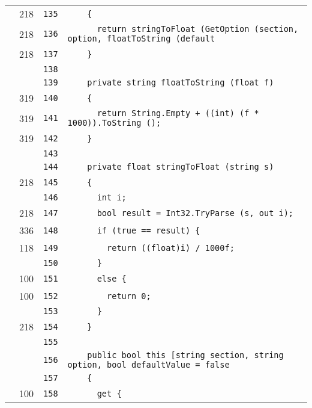 \documentclass[a4paper,10pt]{article}
\begin{document}
\begin{longtable}[l]{lrrl}
\cellcolor{green} & 218 & \verb~135~ & \verb~    {~\\
\cellcolor{green} & 218 & \verb~136~ & \verb~      return stringToFloat (GetOption (section, option, floatToString (default~\\
\cellcolor{green} & 218 & \verb~137~ & \verb~    }~\\
\cellcolor{gray} &  & \verb~138~ & \verb~~\\
\cellcolor{gray} &  & \verb~139~ & \verb~    private string floatToString (float f)~\\
\cellcolor{green} & 319 & \verb~140~ & \verb~    {~\\
\cellcolor{green} & 319 & \verb~141~ & \verb~      return String.Empty + ((int) (f * 1000)).ToString ();~\\
\cellcolor{green} & 319 & \verb~142~ & \verb~    }~\\
\cellcolor{gray} &  & \verb~143~ & \verb~~\\
\cellcolor{gray} &  & \verb~144~ & \verb~    private float stringToFloat (string s)~\\
\cellcolor{green} & 218 & \verb~145~ & \verb~    {~\\
\cellcolor{gray} &  & \verb~146~ & \verb~      int i;~\\
\cellcolor{green} & 218 & \verb~147~ & \verb~      bool result = Int32.TryParse (s, out i);~\\
\cellcolor{green} & 336 & \verb~148~ & \verb~      if (true == result) {~\\
\cellcolor{green} & 118 & \verb~149~ & \verb~        return ((float)i) / 1000f;~\\
\cellcolor{gray} &  & \verb~150~ & \verb~      }~\\
\cellcolor{green} & 100 & \verb~151~ & \verb~      else {~\\
\cellcolor{green} & 100 & \verb~152~ & \verb~        return 0;~\\
\cellcolor{gray} &  & \verb~153~ & \verb~      }~\\
\cellcolor{green} & 218 & \verb~154~ & \verb~    }~\\
\cellcolor{gray} &  & \verb~155~ & \verb~~\\
\cellcolor{gray} &  & \verb~156~ & \verb~    public bool this [string section, string option, bool defaultValue = false~\\
\cellcolor{gray} &  & \verb~157~ & \verb~    {~\\
\cellcolor{green} & 100 & \verb~158~ & \verb~      get {~\\

\end{longtable}
\end{document}
